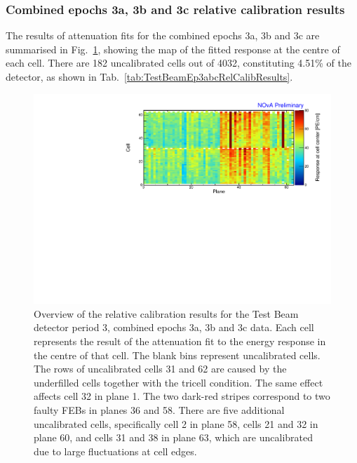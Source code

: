 \subsubsection*{Combined epochs 3a, 3b and 3c relative calibration results}

The results of attenuation fits for the combined epochs 3a, 3b and 3c are summarised in Fig.~\ref{fig:CellCentreResponseEp3abc}, showing the map of the fitted response at the centre of each cell. There are 182 uncalibrated cells out of 4032, constituting 4.51\% of the detector, as shown in Tab.~\ref{tab:TestBeamEp3abcRelCalibResults}.

\begin{figure}[!hbtp]
\centering
\includegraphics[width=\textwidth]{Plots/TBCalibration/CellResponseAtCentre_epoch3abc_Limited_NOvAPlotStyle.pdf}
\caption[Map of fitted response at cell centre for epochs 3a, 3b and 3c data]{Overview of the relative calibration results for the Test Beam detector period 3, combined epochs 3a, 3b and 3c data. Each cell represents the result of the attenuation fit to the energy response in the centre of that cell. The blank bins represent uncalibrated cells. The rows of uncalibrated cells 31 and 62 are caused by the underfilled cells together with the tricell condition. The same effect affects cell 32 in plane 1. The two dark-red stripes correspond to two faulty \glspl{FEB} in planes 36 and 58. There are five additional uncalibrated cells, specifically cell 2 in plane 58, cells 21 and 32 in plane 60, and cells 31 and 38 in plane 63, which are uncalibrated due to large fluctuations at cell edges.}
\label{fig:CellCentreResponseEp3abc}
\end{figure}

